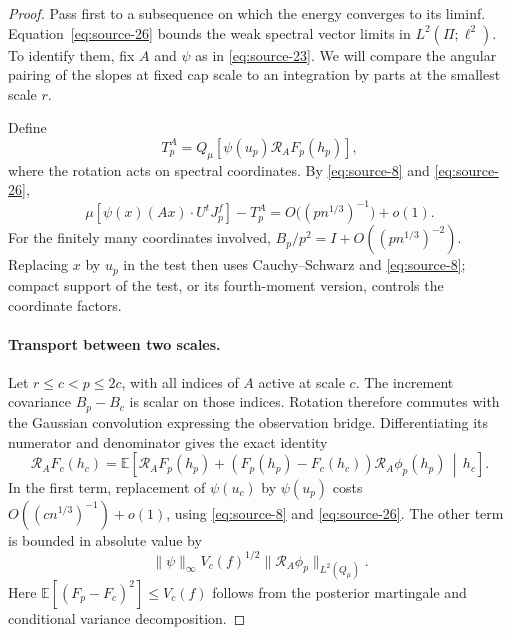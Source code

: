 \begin{proof}
Pass first to a subsequence on which the energy converges to its
liminf. Equation~\eqref{eq:source-26} bounds the weak spectral vector
limits in $L^2(\Pi;\ell^2)$. To identify them, fix $A$ and $\psi$ as
in \eqref{eq:source-23}. We will compare the angular pairing of the
slopes at fixed cap scale to an integration by parts at the smallest
scale $r$.

Define
\[
 T_p^A=Q_\mu[\psi(u_p)\mathcal R_AF_p(h_p)],
\]
where the rotation acts on spectral coordinates. By
\eqref{eq:source-8} and \eqref{eq:source-26},
\[
 \mu[\psi(x)(Ax)\cdot U^tJ_p^f]-T_p^A
       =O\bigl((pn^{1/3})^{-1}\bigr)+o(1).
\]
For the finitely many coordinates involved,
$B_p/p^2=I+O((pn^{1/3})^{-2})$. Replacing $x$ by $u_p$ in the test
then uses Cauchy--Schwarz and \eqref{eq:source-8}; compact support of
the test, or its fourth-moment version, controls the coordinate factors.

\paragraph{Transport between two scales.}
Let $r\le c<p\le2c$, with all indices of $A$ active at scale $c$.
The increment covariance $B_p-B_c$ is scalar on those indices.
Rotation therefore commutes with the Gaussian convolution expressing
the observation bridge. Differentiating its numerator and denominator
gives the exact identity
\begin{equation}
 \mathcal R_AF_c(h_c)
 =\mathbb E\left[
      \mathcal R_AF_p(h_p)
      +(F_p(h_p)-F_c(h_c))\mathcal R_A\phi_p(h_p)
      \,\middle|\,h_c\right].
 \label{eq:source-29}
\end{equation}
In the first term, replacement of $\psi(u_c)$ by $\psi(u_p)$ costs
$O((cn^{1/3})^{-1})+o(1)$, using
\eqref{eq:source-8} and \eqref{eq:source-26}. The other term is bounded
in absolute value by
\begin{equation}
 \|\psi\|_\infty V_c(f)^{1/2}
              \|\mathcal R_A\phi_p\|_{L^2(Q_\mu)}.
 \label{eq:source-30}
\end{equation}
Here $\mathbb E[(F_p-F_c)^2]\le V_c(f)$ follows from the posterior
martingale and conditional variance decomposition.


\end{proof}
